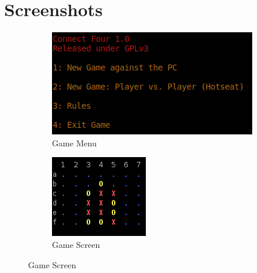 \documentclass[10pt,a4paper,titlepage]{article}
\begin{document}
\section{Screenshots}
\clearpage
\begin{figure}
	\centering
	\begin{subfigure}{.5\textwidth}
		\centering
		\includegraphics[width=0.9\linewidth]{img/menu.png}
		\caption{Game Menu}
		\label{fig:sub1}
	\end{subfigure}%
	\begin{subfigure}{.5\textwidth}
		\centering
		\includegraphics[width=0.9\linewidth]{img/connectfour.png}
		\caption{Game Screen}
		\label{fig:sub2}
	\end{subfigure}
	\label{fig:test}
\end{figure}
\end{document}
